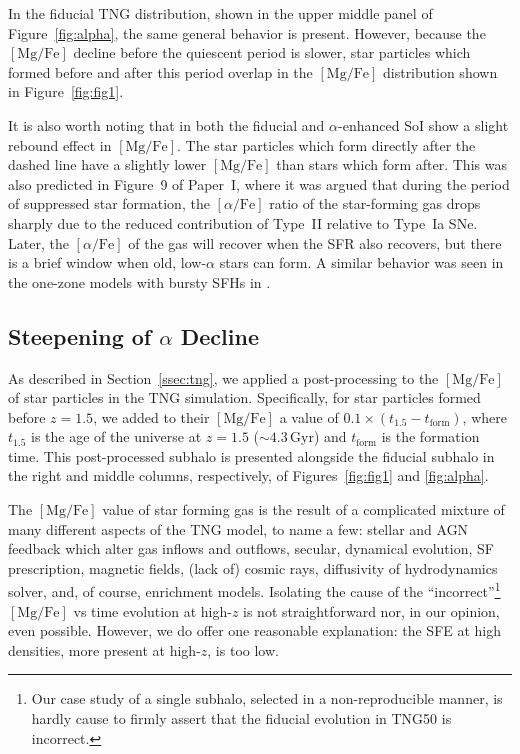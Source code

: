 \documentclass[twocolumn]{aastex631}
\newcommand{\Gyr}{\ensuremath{\textrm{Gyr}}}
\newcommand{\MgFe}{\ensuremath{[\textrm{Mg}/\textrm{Fe}]}}
\newcommand{\alphaFe}{\ensuremath{[\alpha/\textrm{Fe}]}}
\begin{document}
In the fiducial TNG distribution, shown in the upper middle panel of Figure~\ref{fig:alpha}, the same general behavior is present. However, because the \MgFe{} decline before the quiescent period is slower, star particles which formed before and after this period overlap in the \MgFe{} distribution shown in Figure~\ref{fig:fig1}.

It is also worth noting that in both the fiducial and $\alpha$-enhanced SoI show a slight rebound effect in \MgFe{}. The star particles which form directly after the dashed line have a slightly lower \MgFe{} than stars which form after. This was also predicted in Figure~9 of Paper~I, where it was argued that during the period of suppressed star formation, the \alphaFe{} ratio of the star-forming gas drops sharply due to the reduced contribution of Type~II relative to Type~Ia SNe. Later, the \alphaFe{} of the gas will recover when the SFR also recovers, but there is a brief window when old, low-$\alpha$ stars can form. A similar behavior was seen in the one-zone models with bursty SFHs in \citet{2020MNRAS.498.1364J}.

\subsection{Steepening of $\alpha$ Decline}\label{ssec:sfe}
As described in Section~\ref{ssec:tng}, we applied a post-processing to the \MgFe{} of star particles in the TNG simulation. Specifically, for star particles formed before $z=1.5$, we added to their \MgFe{} a value of $0.1\times\left(t_{1.5}-t_{\textrm{form}}\right)$, where $t_{1.5}$ is the age of the universe at $z=1.5$ ($\sim4.3\,\Gyr$) and $t_{\textrm{form}}$ is the formation time. This post-processed subhalo is presented alongside the fiducial subhalo in the right and middle columns, respectively, of Figures~\ref{fig:fig1} and \ref{fig:alpha}.

The \MgFe{} value of star forming gas is the result of a complicated mixture of many different aspects of the TNG model, to name a few: stellar and AGN feedback which alter gas inflows and outflows, secular, dynamical evolution, SF prescription, magnetic fields, (lack of) cosmic rays, diffusivity of hydrodynamics solver, and, of course, enrichment models. Isolating the cause of the ``incorrect''\footnote{Our case study of a single subhalo, selected in a non-reproducible manner, is hardly cause to firmly assert that the fiducial evolution in TNG50 is incorrect.} \MgFe{} vs time evolution at high-$z$ is not straightforward nor, in our opinion, even possible. However, we do offer one reasonable explanation: the SFE at high densities, more present at high-$z$, is too low.
\end{document}
